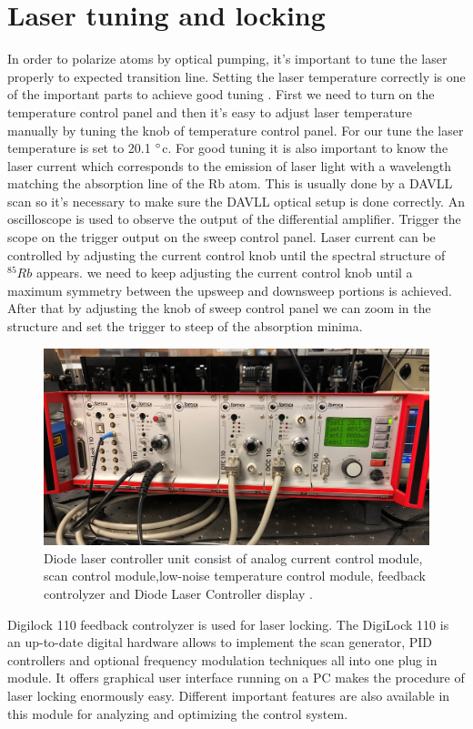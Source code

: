 \section{Laser tuning and locking}
In order to polarize atoms by optical pumping, it's important to tune the laser properly to expected transition line.
Setting the laser temperature correctly is one of the important parts to achieve good tuning . First we need to turn on the temperature control panel and then it’s easy to adjust laser temperature manually by tuning the knob of temperature control panel. For our tune the laser temperature is set to 20.1 $\degree$c. For good tuning it is also important to know the laser current which corresponds to the emission of laser light with a wavelength matching the absorption line of the Rb atom. This is usually done by a DAVLL scan so it's necessary to make sure the DAVLL optical setup is done correctly. An oscilloscope is used to observe the output of the differential amplifier. Trigger the scope on the trigger output on the sweep control panel.
Laser current can be controlled by adjusting the current control knob until the spectral structure of $^{85}Rb$ appears. we need to keep adjusting the current control knob until a maximum symmetry between the upsweep and downsweep portions is achieved. After that by adjusting the knob of sweep control panel we can zoom in the structure and set the trigger to steep of the absorption minima. 
\begin{figure}[h]
\centering
\includegraphics[width=0.8\linewidth]{figures/laser_control_}
\caption{Diode laser controller unit consist of analog current control module, scan control module,low-noise temperature control module, feedback controlyzer and Diode Laser Controller display .\label{fig:laser controller}}
\end{figure}

Digilock 110 feedback controlyzer is used for laser locking. The DigiLock 110 is an up-to-date digital hardware allows to implement the scan generator, PID controllers and optional frequency modulation techniques all into one plug in module. It offers graphical user interface running on a PC makes the procedure of laser locking enormously easy. Different important features are also available in this module for analyzing and optimizing the control system.
 
